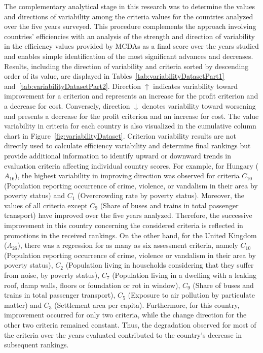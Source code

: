 \documentclass[5p,times]{elsarticle}
\newcounter{example}[section]
\begin{document}
%
The complementary analytical stage in this research was to determine the values and directions of variability among the criteria values for the countries analyzed over the five years surveyed. This procedure complements the approach involving countries' efficiencies with an analysis of the strength and direction of variability in the efficiency values provided by MCDAs as a final score over the years studied and enables simple identification of the most significant advances and decreases. Results, including the direction of variability and criteria sorted by descending order of its value, are displayed in Tables~\ref{tab:variabilityDatasetPart1} and~\ref{tab:variabilityDatasetPart2}. Direction $\uparrow$ indicates variability toward improvement for a criterion and represents an increase for the profit criterion and a decrease for cost. Conversely, direction $\downarrow$ denotes variability toward worsening and presents a decrease for the profit criterion and an increase for cost. The value variability in criteria for each country is also visualized in the cumulative column chart in Figure~\ref{fig:variabilityDataset}. Criterion variability results are not directly used to calculate efficiency variability and determine final rankings but provide additional information to identify upward or downward trends in evaluation criteria affecting individual country scores. For example, for Hungary ($A_{16}$), the highest variability in improving direction was observed for criteria $C_{10}$ (Population reporting occurrence of crime, violence, or vandalism in their area by poverty status) and $C_{1}$ (Overcrowding rate by poverty status). Moreover, the values of all criteria except $C_{9}$ (Share of buses and trains in total passenger transport) have improved over the five years analyzed. Therefore, the successive improvement in this country concerning the considered criteria is reflected in promotions in the received rankings. On the other hand, for the United Kingdom ($A_{26}$), there was a regression for as many as six assessment criteria, namely $C_{10}$ (Population reporting occurrence of crime, violence or vandalism in their area by poverty status), $C_{2}$ (Population living in households considering that they suffer from noise, by poverty status), $C_{7}$ (Population living in a dwelling with a leaking roof, damp walls, floors
or foundation or rot in window), $C_{9}$ (Share of buses and trains in total passenger transport), $C_{5}$ (Exposure to air pollution by
particulate matter) and $C_{3}$ (Settlement area per capita). Furthermore, for this country, improvement occurred for only two criteria, while the change direction for the other two criteria remained constant. Thus, the degradation observed for most of the criteria over the years evaluated contributed to the country's decrease in subsequent rankings.
\end{document}
